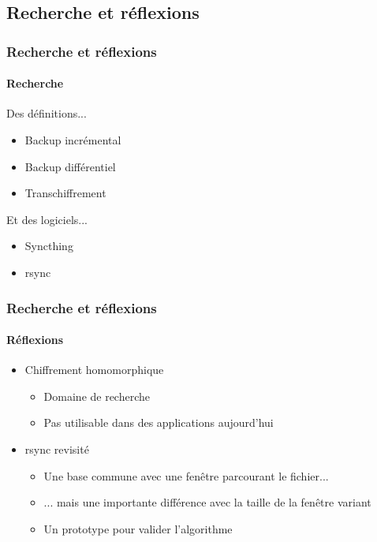 \documentclass{beamer}
\begin{document}
\subsection{Recherche et r\'eflexions}
\begin{frame}
 \frametitle{Recherche et r\'eflexions}
 \framesubtitle{Recherche}
 Des d\'efinitions...
 \begin{itemize}
  \item Backup incr\'emental
  \item Backup diff\'erentiel
  \item Transchiffrement\\[0.51cm]
 \end{itemize}
 
 Et des logiciels...
 \begin{itemize}
  \item Syncthing
  \item rsync
 \end{itemize}
\end{frame}

\begin{frame}
 \frametitle{Recherche et r\'eflexions}
 \framesubtitle{R\'eflexions}
 \begin{itemize}
  \item Chiffrement homomorphique
  \begin{itemize}
   \item Domaine de recherche
   \item Pas utilisable dans des applications aujourd'hui
  \end{itemize}
  \item rsync revisit\'e
  \begin{itemize}
   \item Une base commune avec une fen\^etre parcourant le fichier...
   \item ... mais une importante diff\'erence avec la taille de la fen\^etre
   variant
   \item Un prototype pour valider l'algorithme
  \end{itemize}
 \end{itemize}
\end{frame}
\end{document}
